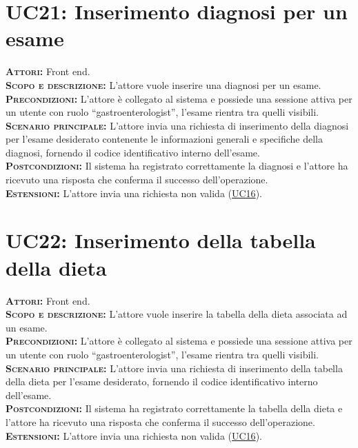 \section{UC21: Inserimento diagnosi per un esame}
\label{sec:UC21}
\textsc{\textbf{Attori:}} Front end.\\
\textsc{\textbf{Scopo e descrizione:}} L'attore vuole inserire una diagnosi per un esame.\\
\textsc{\textsc{\textbf{Precondizioni:}}} L'attore è collegato al sistema e possiede una sessione attiva per un utente con ruolo ``gastroenterologist'', l'esame rientra tra quelli visibili.\\
\textsc{\textbf{Scenario principale:}}  L'attore invia una richiesta di inserimento della diagnosi per l'esame desiderato contenente le informazioni generali e specifiche della diagnosi, fornendo il codice identificativo interno dell'esame.\\
\textsc{\textbf{Postcondizioni:}} Il sistema ha registrato correttamente la diagnosi e l'attore ha ricevuto una risposta che conferma il successo dell'operazione.\\
\textsc{\textbf{Estensioni:}} L'attore invia una richiesta non valida (\hyperref[sec:UC16]{UC16}).

\section{UC22: Inserimento della tabella della dieta}
\label{sec:UC22}
\textsc{\textbf{Attori:}} Front end.\\
\textsc{\textbf{Scopo e descrizione:}} L'attore vuole inserire la tabella della dieta associata ad un esame.\\
\textsc{\textsc{\textbf{Precondizioni:}}} L'attore è collegato al sistema e possiede una sessione attiva per un utente con ruolo ``gastroenterologist'', l'esame rientra tra quelli visibili.\\
\textsc{\textbf{Scenario principale:}}  L'attore invia una richiesta di inserimento della tabella della dieta per l'esame desiderato, fornendo il codice identificativo interno dell'esame.\\
\textsc{\textbf{Postcondizioni:}} Il sistema ha registrato correttamente la tabella della dieta e l'attore ha ricevuto una risposta che conferma il successo dell'operazione.\\
\textsc{\textbf{Estensioni:}} L'attore invia una richiesta non valida (\hyperref[sec:UC16]{UC16}).


